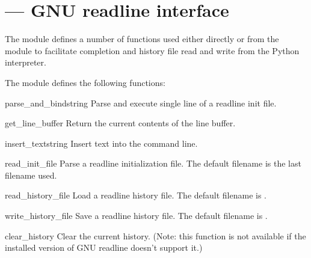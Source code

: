 \section{ ---
         GNU readline interface}



The  module defines a number of functions used either
directly or from the  module to facilitate
completion and history file read and write from the Python
interpreter.

The  module defines the following functions:


\begin{funcdesc}{parse_and_bind}{string}
Parse and execute single line of a readline init file.
\end{funcdesc}

\begin{funcdesc}{get_line_buffer}{}
Return the current contents of the line buffer.
\end{funcdesc}

\begin{funcdesc}{insert_text}{string}
Insert text into the command line.
\end{funcdesc}

\begin{funcdesc}{read_init_file}{}
Parse a readline initialization file.
The default filename is the last filename used.
\end{funcdesc}

\begin{funcdesc}{read_history_file}{}
Load a readline history file.
The default filename is .
\end{funcdesc}

\begin{funcdesc}{write_history_file}{}
Save a readline history file.
The default filename is .
\end{funcdesc}

\begin{funcdesc}{clear_history}{}
Clear the current history.  (Note: this function is not available if
the installed version of GNU readline doesn't support it.)
\end{funcdesc}

